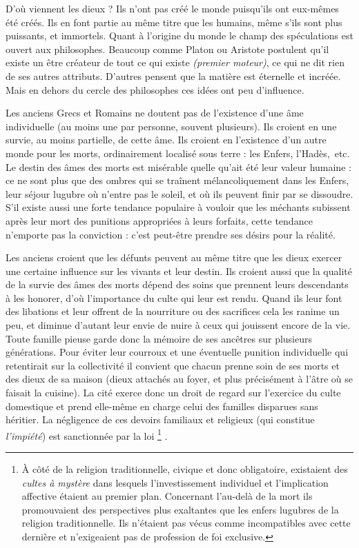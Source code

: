  D'où viennent les dieux ? Ils n'ont pas créé le monde puisqu'ils ont eux-mêmes été créés. Ils en font partie au même titre que les humains, même s'ils sont plus puissants, et immortels. Quant à l'origine du monde le champ des spéculations est ouvert aux philosophes. Beaucoup comme Platon ou Aristote postulent qu'il existe un être créateur de tout ce qui existe \emph{(premier moteur)}, ce qui ne dit rien de ses autres attributs. D'autres pensent que la matière est éternelle et incréée. Mais en dehors du cercle des philosophes ces idées ont peu d'influence. 

 Les anciens Grecs et Romains ne doutent pas de l'existence d'une âme individuelle (au moins une par personne, souvent plusieurs). Ils croient en une survie, au moins partielle, de cette âme. Ils croient en l'existence d'un autre monde pour les morts, ordinairement localisé sous terre : les Enfers, l'Hadès,~etc. Le destin des âmes des morts est misérable quelle qu'ait été leur valeur humaine : ce ne sont plus que des ombres qui se traînent mélancoliquement dans les Enfers, leur séjour lugubre où n'entre pas le soleil, et où ils peuvent finir par se dissoudre. S'il existe aussi une forte tendance populaire à vouloir que les méchants subissent après leur mort des punitions appropriées à leurs forfaits, cette tendance n'emporte pas la conviction : c'est peut-être prendre ses désirs pour la réalité.

 Les anciens croient que les défunts peuvent au même titre que les dieux exercer une certaine influence sur les vivants et leur destin. Ils croient aussi que la qualité de la survie des âmes des morts dépend des soins que prennent leurs descendants à les honorer, d'où l'importance du culte qui leur est rendu. Quand ils leur font des libations et leur offrent de la nourriture ou des sacrifices cela les ranime un peu, et diminue d'autant leur envie de nuire à ceux qui jouissent encore de la vie. Toute famille pieuse garde donc la mémoire de ses ancêtres sur plusieurs générations. Pour éviter leur courroux et une éventuelle punition individuelle qui retentirait sur la collectivité il convient que chacun prenne soin de ses morts et des dieux de sa maison (dieux  attachés au foyer, et plus précisément à l'âtre où se faisait la cuisine). La cité exerce donc un droit de regard sur l'exercice du culte domestique et prend elle-même en charge celui des familles disparues sans héritier. La négligence de ces devoirs familiaux et religieux (qui constitue \emph{l'impiété}) est sanctionnée par la loi%
\footnote{À côté de la religion traditionnelle, civique et donc obligatoire, existaient des \emph{cultes à mystère} dans lesquels l'investissement individuel et l'implication affective étaient au premier plan. Concernant l'au-delà de la mort ils promouvaient des perspectives plus exaltantes que les enfers lugubres de la religion traditionnelle. Ils n'étaient pas vécus comme incompatibles avec cette dernière et n'exigeaient pas de profession de foi exclusive.}%
. 


